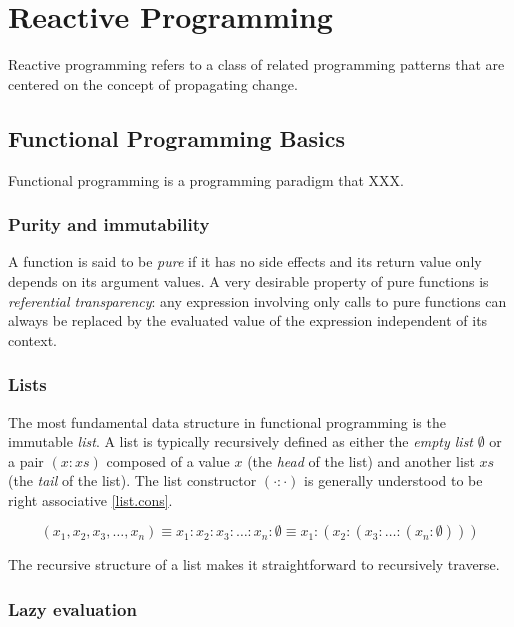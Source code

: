 \chapter{Reactive Programming}

Reactive programming refers to a class of related programming patterns that are centered on the concept of propagating change.

\section{Functional Programming Basics}

Functional programming is a programming paradigm that XXX.

\subsection{Purity and immutability}

A function is said to be \emph{pure} if it has no side effects and its return value only depends on its argument values. A very desirable property of pure functions is \emph{referential transparency}: any expression involving only calls to pure functions can always be replaced by the evaluated value of the expression independent of its context.

\subsection{Lists}\label{react.func.lists}

The most fundamental data structure in functional programming is the immutable \emph{list}. A list is typically recursively defined as either the \emph{empty list} $\emptyset$ or a pair $(x : xs)$ composed of a value $x$ (the \emph{head} of the list) and another list $xs$ (the \emph{tail} of the list). The list constructor $(\cdot : \cdot)$ is generally understood to be right associative \eqref{list.cons}.

\begin{equation}\label{list.cons}
(x_1, x_2, x_3, \dots, x_n) \equiv x_1 : x_2 : x_3 : \dots : x_n : \emptyset \equiv x_1 : (x_2 : (x_3 : \dots : (x_n : \emptyset)))
\end{equation}

The recursive structure of a list makes it straightforward to recursively traverse.

\subsection{Lazy evaluation}

